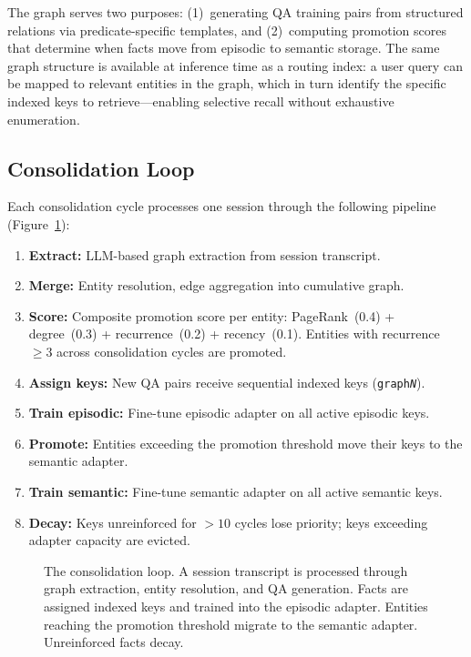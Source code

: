 \documentclass[11pt]{article}
\begin{document}
The graph serves two purposes: (1)~generating QA training pairs from structured relations via predicate-specific templates, and (2)~computing promotion scores that determine when facts move from episodic to semantic storage.
The same graph structure is available at inference time as a routing index: a user query can be mapped to relevant entities in the graph, which in turn identify the specific indexed keys to retrieve---enabling selective recall without exhaustive enumeration.

\subsection{Consolidation Loop}
\label{sec:loop}

Each consolidation cycle processes one session through the following pipeline (Figure~\ref{fig:pipeline}):

\begin{enumerate}
    \item \textbf{Extract:} LLM-based graph extraction from session transcript.
    \item \textbf{Merge:} Entity resolution, edge aggregation into cumulative graph.
    \item \textbf{Score:} Composite promotion score per entity: PageRank~(0.4) + degree~(0.3) + recurrence~(0.2) + recency~(0.1). Entities with recurrence $\geq 3$ across consolidation cycles are promoted.
    \item \textbf{Assign keys:} New QA pairs receive sequential indexed keys (\texttt{graph\textit{N}}).
    \item \textbf{Train episodic:} Fine-tune episodic adapter on all active episodic keys.
    \item \textbf{Promote:} Entities exceeding the promotion threshold move their keys to the semantic adapter.
    \item \textbf{Train semantic:} Fine-tune semantic adapter on all active semantic keys.
    \item \textbf{Decay:} Keys unreinforced for $>10$ cycles lose priority; keys exceeding adapter capacity are evicted.
\end{enumerate}

\begin{figure}[t]
    \centering
    
    \caption{The consolidation loop. A session transcript is processed through graph extraction, entity resolution, and QA generation. Facts are assigned indexed keys and trained into the episodic adapter. Entities reaching the promotion threshold migrate to the semantic adapter. Unreinforced facts decay.}
    \label{fig:pipeline}
\end{figure}
\end{document}
